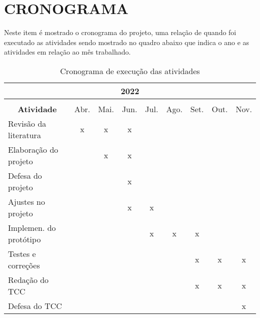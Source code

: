 \chapter{CRONOGRAMA}\label{chp:CRONOGRAMA}

Neste item é mostrado o cronograma do projeto, uma relação de quando foi executado as atividades sendo mostrado no quadro abaixo que indica o ano e as atividades em relação ao mês trabalhado.

\begin{table}[!h]
    \caption{Cronograma de execução das atividades}
	\centering
		\begin{tabular}{|l|c|c|c|c|c|c|c|c|}
		\hline
		\multicolumn{9}{|c|}{\textbf{2022}}\\
		\hline
		\multicolumn{9}{c}{}\\
		\hline
		\multicolumn{1}{|c|}{\textbf{Atividade}}&Abr.&Mai.&Jun.&Jul.&Ago.&Set.&Out.&Nov.\\
		\hline
		Revisão da literatura                 &x&x&x&&&&&\\
		\hline
		Elaboração do projeto                 &&x&x&&&&&\\
		\hline	
		Defesa do projeto                     &&&x&&&&&\\
		\hline			
		Ajustes no projeto                    &&&x&x&&&&\\
		\hline	
		Implemen. do protótipo            &&&&x&x&x&&\\
		\hline	
		Testes e correções                    &&&&&&x&x&x\\
		\hline	
		Redação do TCC                       &&&&&&x&x&x\\
		\hline	
		Defesa do TCC                        &&&&&&&&x\\
		\hline	
		\end{tabular}
\end{table}

